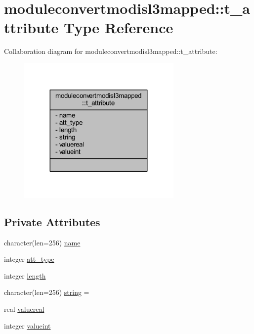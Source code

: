 \hypertarget{structmoduleconvertmodisl3mapped_1_1t__attribute}{}\section{moduleconvertmodisl3mapped\+:\+:t\+\_\+attribute Type Reference}
\label{structmoduleconvertmodisl3mapped_1_1t__attribute}


Collaboration diagram for moduleconvertmodisl3mapped\+:\+:t\+\_\+attribute\+:\nopagebreak
\begin{figure}[H]
\begin{center}
\leavevmode
\includegraphics[width=227pt]{structmoduleconvertmodisl3mapped_1_1t__attribute__coll__graph}
\end{center}
\end{figure}
\subsection*{Private Attributes}
\begin{DoxyCompactItemize}
\item 
character(len=256) \mbox{\hyperlink{structmoduleconvertmodisl3mapped_1_1t__attribute_a3eb07ef0f7b4e10e0696139c5a08c0a4}{name}}
\item 
integer \mbox{\hyperlink{structmoduleconvertmodisl3mapped_1_1t__attribute_aba6ce31241736f768f5b82c0624bb719}{att\+\_\+type}}
\item 
integer \mbox{\hyperlink{structmoduleconvertmodisl3mapped_1_1t__attribute_a3937f9a838f212b049dd30745ff40ba8}{length}}
\item 
character(len=256) \mbox{\hyperlink{structmoduleconvertmodisl3mapped_1_1t__attribute_a5b9039e9940d91ecc5fe3d937fd4b6af}{string}} = \textquotesingle{} \textquotesingle{}
\item 
real \mbox{\hyperlink{structmoduleconvertmodisl3mapped_1_1t__attribute_a4aed31ba5bef5349a9e852d87dd98e70}{valuereal}}
\item 
integer \mbox{\hyperlink{structmoduleconvertmodisl3mapped_1_1t__attribute_a667d726e55959cdd01123038cce5c116}{valueint}}
\end{DoxyCompactItemize}


